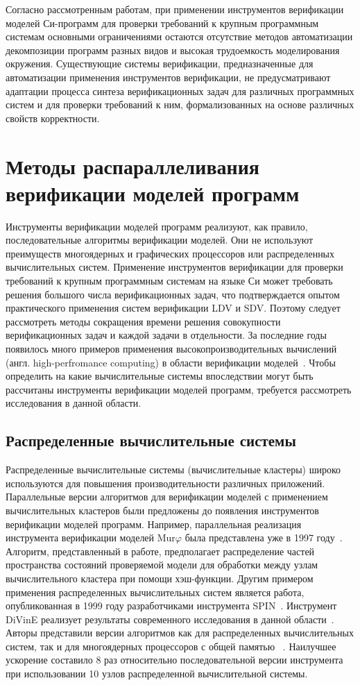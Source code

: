 Согласно рассмотренным работам, при применении инструментов верификации моделей Си-программ для проверки требований к крупным программным системам основными ограничениями остаются отсутствие методов автоматизации декомпозиции программ разных видов и высокая трудоемкость моделирования окружения.
Существующие системы верификации, предназначенные для автоматизации применения инструментов верификации, не предусматривают адаптации процесса синтеза верификационных задач для различных программных систем и для проверки требований к ним, формализованных на основе различных свойств корректности.

\section{Методы распараллеливания верификации моделей программ}

Инструменты верификации моделей программ реализуют, как правило, последовательные алгоритмы верификации моделей.
Они не используют преимуществ многоядерных и графических процессоров или распределенных вычислительных систем.
Применение инструментов верификации для проверки требований к крупным программным системам на языке Си может требовать решения большого числа верификационных задач, что подтверждается опытом практического применения систем верификации LDV и SDV.
Поэтому следует рассмотреть методы сокращения времени решения совокупности верификационных задач и каждой задачи в отдельности.
За последние годы появилось много примеров применения высокопроизводительных вычислений (англ. high-perfromance computing) в области верификации моделей~\cite{survey:new}.
Чтобы определить на какие вычислительные системы впоследствии могут быть рассчитаны инструменты верификации моделей программ, требуется рассмотреть исследования в данной области. 

\subsection{Распределенные вычислительные системы}
Распределенные вычислительные системы (вычислительные кластеры) широко используются для повышения производительности различных приложений.
Параллельные версии алгоритмов для верификации моделей с применением вычислительных кластеров были предложены до появления инструментов верификации моделей программ.
Например, параллельная реализация инструмента верификации моделей Mur$\varphi$ была представлена уже в 1997 году~\cite{Stern97parallelizingthe}.
Алгоритм, представленный в работе, предполагает распределение частей пространства состояний проверяемой модели для обработки между узлам вычислительного кластера при помощи хэш-функции.
Другим примером применения распределенных вычислительных систем является работа, опубликованная в 1999 году разработчиками инструмента SPIN~\cite{Lerda1999}.
Инструмент DiVinE реализует результаты современного исследования в данной области~\cite{VW86b}.
Авторы представили версии алгоритмов как для распределенных вычислительных систем, так и для многоядерных процессоров с общей памятью ~\cite{Barnat:2010:SSM,HiBi.2009,Barnat2009,Barnat5161000}.
Наилучшее ускорение составило 8 раз относительно последовательной версии инструмента при использовании 10 узлов распределенной вычислительной системы.


